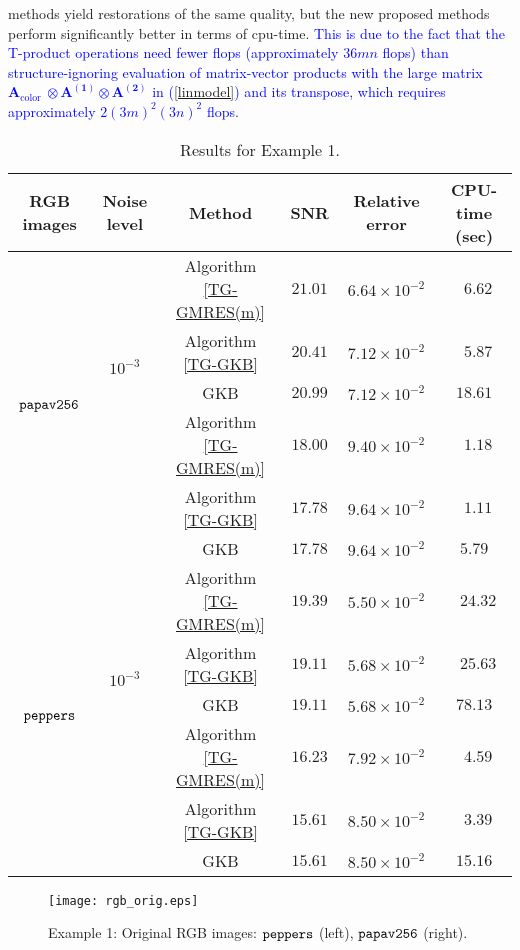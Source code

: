 \documentclass{siamltex}
\newcommand{\1}{\mathbb{1}}
\newcommand{\0}{\mathbb{0}}
\begin{document}
	methods yield restorations of the same quality, but the new proposed methods perform significantly better in terms of cpu-time. \textcolor{blue}{This is due to the fact that the T-product operations need fewer flops (approximately $36mn$ flops) than structure-ignoring evaluation of matrix-vector products with the large matrix $\mathbf{A}_{\text {color }} \otimes \mathbf{A^{(1)}}\otimes\mathbf{A^{(2)}}$ in (\ref{linmodel}) and its transpose, which requires approximately $2 (3m)^{2}(3n)^{2}$ flops}.
	\begin{table}[htbp]
		\begin{center}\footnotesize
			\renewcommand{\arraystretch}{1.3}
			\begin{tabular}{cccccc}\hline
				\multicolumn{1}{c}{{RGB images}} &\multicolumn{1}{c}{{Noise level}} & \multicolumn{1}{c}{{Method}}& 
				\multicolumn{1}{c}{{SNR}} & Relative error& CPU-time (sec) \\ 
				\hline 
				\multirow{6}{*}{$\tt papav256$}&\multirow{4}{3em}{$10^{-3}$}&Algorithm \ref{TG-GMRES(m)} &$21.01$&$6.64\times10^{-2}$&$\phantom{1}6.62$\\
				&&Algorithm \ref{TG-GKB}&$20.41$& $7.12\times10^{-2}$&$\phantom{1}5.87$\\
				&&GKB&$20.99$&$7.12\times10^{-2}$&$18.61$\\
				\cline{2-6}
				&\multirow{4}{3em}{$10^{-2}$}&Algorithm \ref{TG-GMRES(m)}&$18.00$&$9.40\times10^{-2}$&$\phantom{1}1.18$\\
				&	&Algorithm \ref{TG-GKB}&$17.78$&$9.64\times10^{-2}$&$\phantom{1}1.11$\\
				&&GKB&$17.78$&$9.64\times10^{-2}$&$5.79$\\
				\hline 
				\multirow{6}{*}{$\tt peppers$}&\multirow{4}{3em}{$10^{-3}$}&Algorithm \ref{TG-GMRES(m)} &$19.39$&$5.50\times10^{-2}$&$\phantom{1}24.32$\\
				&&Algorithm \ref{TG-GKB}&$19.11$& $5.68\times10^{-2}$&$\phantom{1}25.63$\\
				&&GKB&$19.11$&$5.68\times10^{-2}$&$78.13$\\
				\cline{2-6}
				&\multirow{4}{3em}{$10^{-2}$}&Algorithm \ref{TG-GMRES(m)}&$16.23$&$7.92\times10^{-2}$&$\phantom{1}4.59$\\
				&	&Algorithm \ref{TG-GKB}&$15.61$&$8.50\times10^{-2}$&$\phantom{1}3.39$\\
				&&GKB&$15.61$&$8.50\times10^{-2}$&$15.16$\\
				\hline 
			\end{tabular}
			\caption{Results for Example 1.}\label{tab1}
		\end{center}
	\end{table}
	\begin{figure}
		\begin{center}
			\texttt{[image: rgb\_orig.eps]}
			\caption{Example 1: Original RGB images:  $\tt peppers$ (left), $\tt papav256$ (right).}\label{fig1}
		\end{center}
	\end{figure}
	
\end{document}
